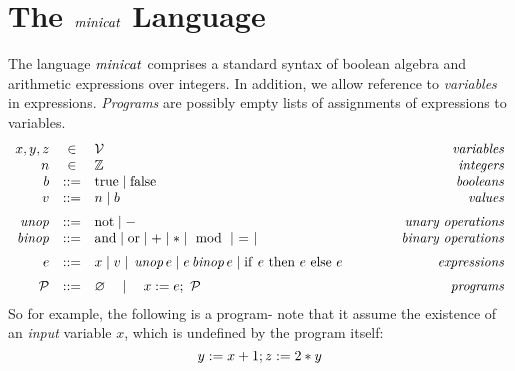 \section{The $\mathit{minicat}$ Language}

The language $\mathit{minicat}$ comprises a standard syntax of
boolean algebra and arithmetic expressions over integers. In addition, we allow reference
to \emph{variables} in expressions. \emph{Programs} are possibly empty
lists of assignments of expressions to variables.
$$
\begin{array}{rcl@{\qquad\qquad}r}
x,y,z &\in& \mathcal{V} & \textit{variables}\\
n &\in& \mathbb{Z} & \textit{integers}\\
b &::=& \true \mid \false & \textit{booleans}\\
v &::=& n \mid b & \textit{values} \\[2mm]
\mathit{unop} &::=& \mathrm{not} \mid - & \textit{unary operations} \\
\mathit{binop} &::=& \mathrm{and} \mid \mathrm{or} \mid + \mid * \mid \mod \mid\ =\ \mid & \textit{binary operations} \\[2mm]
e &::=& x \mid v \mid\, \mathit{unop}\, e \mid e\, \mathit{binop}\, e \mid  \eite{e}{e}{e}  & \textit{expressions}\\[2mm]
\prog &::=& \varnothing\quad \mid\quad \eassign{x}{e};\ \prog & \textit{programs}
\end{array}
$$
So for example, the following is a program- note that it assume the existence of an
\emph{input} variable $x$, which is undefined by the program itself:
$$
y := x + 1; z := 2 * y
$$

